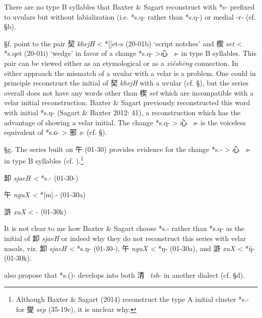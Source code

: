 There are no type B syllables that Baxter \& Sagart reconstruct with *s-
prefixed to uvulars but without labialization (i.e. *s.q- rather than
*s.q{}-) or medial -r- (cf. §b).

§f. 
\citet[137]{Baxter2014OldChinese}
point to the pair 契 \emph{khejH}
\textless{} *[{}]{}et-s (20-01b) `script notches' and 楔  \emph{set}
\textless{} *s.q{}et (20-01i) `wedge' in favor of a change *s.q{}-
\textgreater{}心~ \emph{s}- in type B syllables. This pair can be viewed
either as an etymological or as a  \emph{xiéshēng} connection. In either
approach the mismatch of a uvular with a velar is a problem. One could
in principle reconstruct the initial of 契  \emph{khejH} with a uvular
(cf. §), but the series overall does not have any words other than 楔
 \emph{set} which are incompatible with a velar initial reconstruction.
Baxter \& Sagart previously reconstructed this word with initial *s.ŋ-
(Sagart \& Baxter 2012: 41), a reconstruction which has the advantage of
showing a velar initial. The change *s.q- \textgreater{} 心~ \emph{s}- is
the voiceless equivalent of *s.ɢ- \textgreater{} 邪  \emph{z}- (cf. §).

§g. The series built on 午 (01-30) provides evidence for the change
*s.{}- \textgreater{} 心~ \emph{s}- in type B syllables (cf. 
\citet[140]{Baxter2014OldChinese}).\footnote{Although Baxter \& Sagart (2014) reconstruct
  the type A initial cluster *s.{}{}- for 燮  \emph{sep} (35-19c), it is
  unclear why.}

\begin{description} \item
卸  \emph{sjaeH \textless{} }*s.{}- (01-30-)
\item
午  \emph{nguX \textless{} }*[m].{}{}- (01-30a)
 \item
滸  \emph{xuX} \textless{} {}{}- (01-30k)
\end{description}

It is not clear to me how Baxter \& Sagart choose *s.{}- rather than
*s.q- as the initial of 卸 \emph{sjaeH} or indeed why they do not
reconstruct this series with velar nasals, viz. 卸  \emph{sjaeH
\textless{} }*s.ŋ- (01-30-), 午 \emph{nguX \textless{} }*ŋ{}- (01-30a),
and 滸  \emph{xuX} \textless{} *ŋ̊{}- (01-30k).

\citet[140]{Baxter2014OldChinese}
also propose that *s.{}({})- develops into
both 清~ \emph{tsh}- in another dialect (cf. §d).

